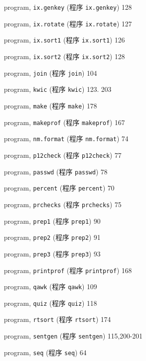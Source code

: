 \begin{multicols}{2}
\hangindent=2pc  program, \verb'ix.genkey' (程序 \verb'ix.genkey')
128

\hangindent=2pc  program, \verb'ix.rotate' (程序 \verb'ix.rotate')
127

\hangindent=2pc  program, \verb'ix.sort1' (程序 \verb'ix.sort1') 126

\hangindent=2pc  program, \verb'ix.sort2' (程序 \verb'ix.sort2') 128

\hangindent=2pc  program, \verb'join' (程序 \verb'join') 104

\hangindent=2pc  program, \verb'kwic' (程序 \verb'kwic') 123. 203

\hangindent=2pc  program, \verb'make' (程序 \verb'make') 178

\hangindent=2pc  program, \verb'makeprof' (程序 \verb'makeprof') 167

\hangindent=2pc  program, \verb'nm.format' (程序 \verb'nm.format')
74

\hangindent=2pc  program, \verb'p12check' (程序 \verb'p12check') 77

\hangindent=2pc  program, \verb'passwd' (程序 \verb'passwd') 78

\hangindent=2pc  program, \verb'percent' (程序 \verb'percent') 70

\hangindent=2pc  program, \verb'prchecks' (程序 \verb'prchecks') 75

\hangindent=2pc  program, \verb'prep1' (程序 \verb'prep1') 90

\hangindent=2pc  program, \verb'prep2' (程序 \verb'prep2') 91

\hangindent=2pc  program, \verb'prep3' (程序 \verb'prep3') 93

\hangindent=2pc  program, \verb'printprof' (程序
\verb'printprof') 168

\hangindent=2pc  program, \verb'qawk' (程序 \verb'qawk') 109

\hangindent=2pc  program, \verb'quiz'  (程序 \verb'quiz') 118

\hangindent=2pc  program, \verb'rtsort'  (程序 \verb'rtsort') 174

\hangindent=2pc  program, \verb'sentgen'  (程序 \verb'sentgen')
115,200-201

\hangindent=2pc  program, \verb'seq'  (程序 \verb'seq') 64


\end{multicols}
